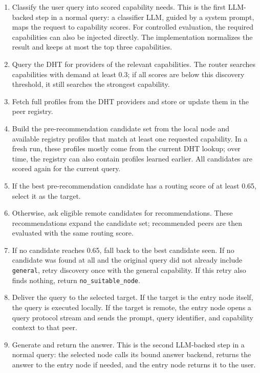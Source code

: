 \begin{enumerate}
  \item Classify the user query into scored capability needs. This is the first
  LLM-backed step in a normal query: a classifier LLM, guided by a system
  prompt, maps the request to capability scores. For controlled evaluation, the
  required capabilities can also be injected directly. The implementation
  normalizes the result and keeps at most the top three capabilities.
  \item Query the DHT for providers of the relevant capabilities. The router
  searches capabilities with demand at least 0.3; if all scores are below this
  discovery threshold, it still searches the strongest capability.
  \item Fetch full profiles from the DHT providers and store or update them in
  the peer registry.
  \item Build the pre-recommendation candidate set from the local node and
  available registry profiles that match at least one requested capability. In a
  fresh run, these profiles mostly come from the current DHT lookup; over time,
  the registry can also contain profiles learned earlier. All candidates are
  scored again for the current query.
  \item If the best pre-recommendation candidate has a routing score of at least
  0.65, select it as the target.
  \item Otherwise, ask eligible remote candidates for recommendations. These
  recommendations expand the candidate set; recommended peers are then evaluated
  with the same routing score.
  \item If no candidate reaches 0.65, fall back to the best candidate seen. If
  no candidate was found at all and the original query did not already include
  \texttt{general}, retry discovery once with the general capability. If this
  retry also finds nothing, return \texttt{no\_suitable\_node}.
  \item Deliver the query to the selected target. If the target is the entry
  node itself, the query is executed locally. If the target is remote, the entry
  node opens a query protocol stream and sends the prompt, query identifier, and
  capability context to that peer.
  \item Generate and return the answer. This is the second LLM-backed step in a
  normal query: the selected node calls its bound answer backend, returns the
  answer to the entry node if needed, and the entry node returns it to the user.
\end{enumerate}

